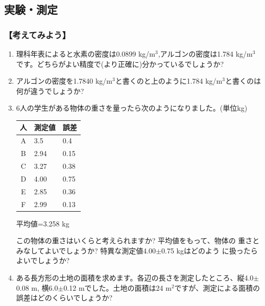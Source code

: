 \subsection{実験・測定}

\subsubsection*{【考えてみよう】}

\begin{enumerate}

\item 理科年表によると水素の密度は0.0899 kg/m${}^3$,アルゴンの密度は1.784 kg/m${}^3$です。どちらがよい精度で(より正確に)分かっているでしょうか?

\item アルゴンの密度を1.7840 kg/m${}^3$と書くのと上のように1.784 kg/m${}^3$と書くのは何が違うでしょうか?

\item  6人の学生がある物体の重さを量ったら次のようになりました。(単位kg)

\begin{tabular}{|c|l|l|}
\hline
人&測定値&誤差\\
\hline
A&3.5&0.4\\
B&2.94&0.15\\
C&3.27&0.38\\
D&4.00&0.75\\
E&2.85&0.36\\
F&2.99&0.13\\
\hline
\end{tabular}
\qquad 平均値=3.258 kg

この物体の重さはいくらと考えられますか? 平均値をもって、物体の 
重さとみなしてよいでしょうか? 特異な測定値4.00$\pm$0.75 kgはどのよう 
に扱ったらよいでしょうか?

\item ある長方形の土地の面積を求めます。各辺の長さを測定したところ、縦4.0$\pm$0.08 m, 横6.0$\pm$0.12 mでした。土地の面積は24 m${}^2$ですが、測定による面積の誤差はどのくらいでしょうか?

\end{enumerate}

